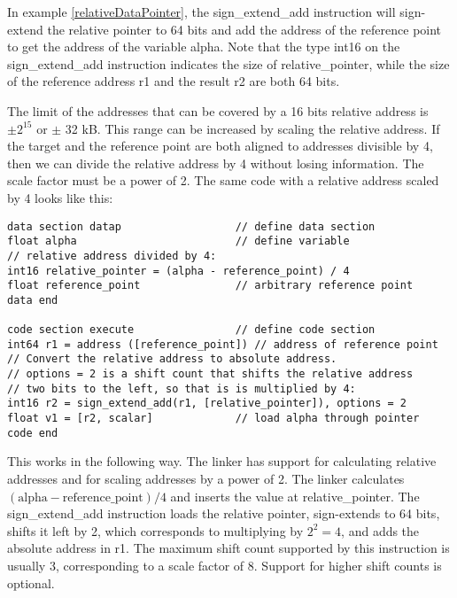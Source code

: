 \documentclass[forwardcom.tex]{subfiles}
\begin{document}
In example \ref{relativeDataPointer}, the sign\_extend\_add instruction will sign-extend the relative pointer to 64 bits and add the address of the reference point to get the address of the variable alpha. Note that the type int16 on the sign\_extend\_add instruction indicates the size of relative\_pointer, while the size of the reference address r1 and the result r2 are both 64 bits.
\vv

The limit of the addresses that can be covered by a 16 bits relative address is $\pm 2^{15}$ or $\pm$ 32 kB. This range can be increased by scaling the relative address. If the target and the reference point are both aligned to addresses divisible by 4, then we can divide the relative address by 4 without losing information. The scale factor must be a power of 2. The same code with a relative address scaled by 4 looks like this:

\begin{example}
\label{relativeDataPointerScaled}
\end{example}
\begin{lstlisting}[frame=single]
data section datap                  // define data section
float alpha                         // define variable
// relative address divided by 4:
int16 relative_pointer = (alpha - reference_point) / 4
float reference_point               // arbitrary reference point
data end

code section execute                // define code section
int64 r1 = address ([reference_point]) // address of reference point
// Convert the relative address to absolute address. 
// options = 2 is a shift count that shifts the relative address 
// two bits to the left, so that is is multiplied by 4:
int16 r2 = sign_extend_add(r1, [relative_pointer]), options = 2
float v1 = [r2, scalar]             // load alpha through pointer
code end
\end{lstlisting}
\vv

This works in the following way. The linker has support for calculating relative addresses and for scaling addresses by a power of 2. The linker calculates 
$(\mathrm{alpha} - \mathrm{reference\_point}) / 4$ and inserts the value at 
relative\_pointer. 
The sign\_extend\_add instruction loads the relative pointer, sign-extends to 64 bits, shifts it left by 2, which corresponds to multiplying by $2^2 = 4$, and adds the absolute address in r1. The maximum shift count supported by this instruction is usually 3, corresponding to a scale factor of 8. Support for higher shift counts is optional.
\vv
\end{document}
